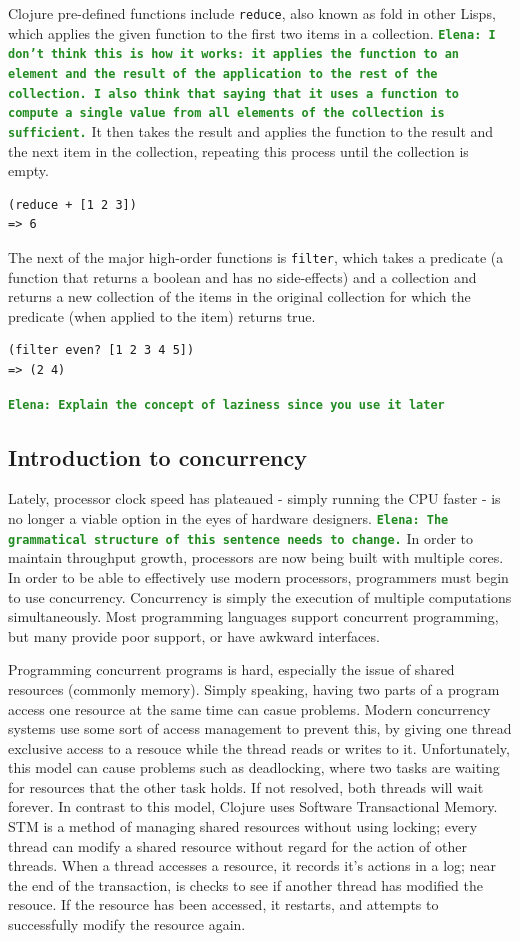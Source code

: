 \documentclass[12pt]{article}
\newcommand{\comment}[1]{{\bf \tt  {#1}}}
\newcommand{\emcomment}[1]{\textcolor{ForestGreen}{\comment{Elena: {#1}}}}
\newcommand{\clocode}[1]{{\texttt {#1}}}
\begin{document}
Clojure pre-defined functions include \clocode{reduce}, also known as fold in other Lisps, which applies the given function to the first two items in a collection. \emcomment{I don't think this is how it works: it applies the function to an element and the result of the application to the rest of the collection. I also think that saying that it uses a function to compute a single value from all elements of the collection is sufficient.} It then takes the result and applies the function to the result and the next item in the collection, repeating this process until the collection is empty.
\begin{verbatim}
(reduce + [1 2 3])
=> 6
\end{verbatim}
The next of the major high-order functions is \clocode{filter}, which takes a predicate (a function that returns a boolean and has no side-effects) and a collection and returns a new collection of the items in the original collection for which the predicate (when applied to the item) returns true.
\begin{verbatim}
(filter even? [1 2 3 4 5])
=> (2 4)
\end{verbatim}
\emcomment{Explain the concept of laziness since you use it later}

\subsection{Introduction to concurrency}\label{sec:concurrency}
 Lately, processor clock speed has plateaued - simply running the CPU faster - is no longer a viable option in the eyes of hardware designers.
\emcomment{The grammatical structure of this sentence needs to change.}
In order to maintain throughput growth, processors are now being built with multiple cores. In order to be able to effectively use modern processors, programmers must begin to use concurrency. Concurrency is simply the execution of multiple computations simultaneously. Most programming languages support concurrent programming, but many provide poor support, or have awkward interfaces. 

Programming concurrent programs is hard, especially the issue of shared resources (commonly memory). Simply speaking, having two parts of a program access one resource at the same time can casue problems. Modern concurrency systems use some sort of access management to prevent this, by giving one thread exclusive access to a resouce while the thread reads or writes to it. Unfortunately, this model can cause problems such as deadlocking, where two tasks are waiting for resources that the other task holds. If not resolved, both threads will wait forever. In contrast to this model, Clojure uses Software Transactional Memory. STM is a method of managing shared resources without using locking; every thread can modify a shared resource without regard for the action of other threads. When a thread accesses a resource, it records it's actions in a log; near the end of the transaction, is checks to see if another thread has modified the resouce. If the resource has been accessed, it restarts, and attempts to successfully modify the resource again.
\end{document}

